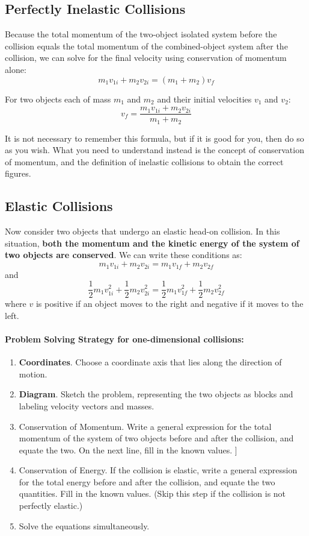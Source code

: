  \subsection{Perfectly Inelastic Collisions}
 Because the total momentum of the two-object isolated system before the collision equals the total momentum of the combined-object system after the collision, we can solve for the final velocity using conservation of momentum alone:
$$m_1v_{1i}+m_2v_{2i}= (m_1+m_2)v_f$$
\begin{form}
For two objects each of mass $m_1$ and $m_2$ and their initial velocities $v_1$ and $v_2$:
$$v_f = \frac{m_1v_{1i}+m_2v_{2i}}{m_1 + m_2}$$
\end{form}
It is not necessary to remember this formula, but if it is good for you, then do so as you wish. What you need to understand instead is the concept of conservation of momentum, and the definition of inelastic collisions to obtain the correct figures.

\subsection{Elastic Collisions}
Now consider two objects that undergo an elastic head-on collision. In this situation,\textbf{ both the momentum and the kinetic energy of the system of two objects are conserved}. We can write these conditions as:
$$m_1v_{1i} + m_2v_{2i} = m_1v_{1f} + m_2v_{2f}$$  and
$$ \frac{1}{2}m_1v_{1i}^2 + \frac{1}{2}m_2v_{2i}^2 = \frac{1}{2}m_1v_{1f}^2 + \frac{1}{2}m_2v_{2f}^2$$
where $v$ is positive if an object moves to the right and negative if it moves to the left.

\paragraph*{Problem Solving Strategy for one-dimensional collisions:}
\begin{enumerate}
\item \textbf{Coordinates}. Choose a coordinate axis that lies along the direction of motion.
\item \textbf{Diagram}. Sketch the problem, representing the two objects as blocks and labeling velocity vectors and masses.
\item Conservation of Momentum. Write a general expression for the total momentum of the system of two objects before and after the collision, and equate the two. On the next line, fill in the known values.
]\item Conservation of Energy. If the collision is elastic, write a general expression for the total energy before and after the collision, and equate the two quantities. Fill in the known values. (Skip this step if the collision is not perfectly elastic.)
\item Solve the equations simultaneously. 
\end{enumerate}

